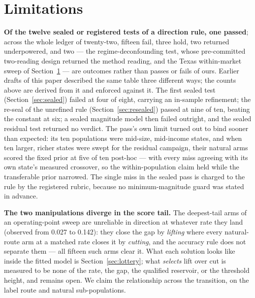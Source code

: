 \documentclass[conference]{IEEEtran}
\begin{document}
\section{Limitations}
\label{sec:limitations}

\textbf{Of the twelve sealed or registered tests of a direction rule, one passed}; across the
whole ledger of twenty-two, fifteen fail, three hold, two returned underpowered, and two --- the regime-deconfounding test, whose pre-committed two-reading design returned the method reading, and the Texas within-market sweep of Section~\ref{sec:limitations} --- are outcomes rather than passes or fails of ours. Earlier drafts of this paper described
the same table three different ways; the counts above are derived from it and enforced against
it. The first
sealed test (Section~\ref{sec:sealed}) failed at four of eight, carrying an in-sample
refinement; the re-seal of the unrefined rule (Section~\ref{sec:resealed}) passed at nine of
ten, beating the constant at six; a sealed magnitude model then failed outright, and the
sealed residual test returned no verdict. The pass's own limit turned out to bind sooner
than expected: its ten populations were mid-size, mid-income states, and when ten larger,
richer states were swept for the residual campaign, their natural arms scored the fixed
prior at five of ten post-hoc --- with every miss agreeing with its own state's measured
crossover, so the within-population claim held while the transferable prior narrowed. The
single miss in the sealed pass is charged to the rule by the registered rubric, because no
minimum-magnitude guard was stated in advance.

\textbf{The two manipulations diverge in the score tail.} The deepest-tail arms of an
operating-point sweep are unreliable in direction at whatever rate they land (observed from
0.027 to 0.142): they close the gap by \emph{lifting} where every natural-route arm at a
matched rate closes it by \emph{cutting}, and the accuracy rule does not separate them ---
all fifteen such arms clear it. What each solution looks like inside the fitted model is
Section~\ref{sec:lottery}; what \emph{selects} lift over cut is measured to be none of the
rate, the gap, the qualified reservoir, or the threshold height, and remains open. We claim
the relationship across the transition, on the label route and natural sub-populations.
\end{document}
